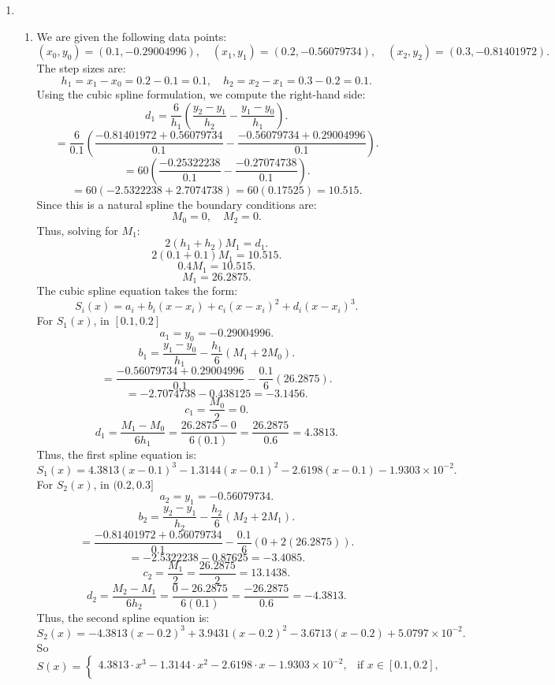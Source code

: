 \documentclass[12pt]{article}
\begin{document}
\begin{enumerate}[leftmargin=2em]
    \item
    \begin{enumerate}
        \item
        We are given the following data points:
        \[ (x_0, y_0) = (0.1, -0.29004996), \quad (x_1, y_1) = (0.2, -0.56079734), \quad (x_2, y_2) = (0.3, -0.81401972).   \]
        The step sizes are:
        \[h_1 = x_1 - x_0 = 0.2 - 0.1 = 0.1, \quad h_2 = x_2 - x_1 = 0.3 - 0.2 = 0.1.\]
        Using the cubic spline formulation, we compute the right-hand side: \[d_1 = \frac{6}{h_1} \left( \frac{y_2 - y_1}{h_2} - \frac{y_1 - y_0}{h_1} \right).\]
        \[= \frac{6}{0.1} \left( \frac{-0.81401972 + 0.56079734}{0.1} - \frac{-0.56079734 + 0.29004996}{0.1} \right).\]
        \[= 60 \left( \frac{-0.25322238}{0.1} - \frac{-0.27074738}{0.1} \right).\]
        \[= 60 (-2.5322238 + 2.7074738) = 60 (0.17525) = 10.515.\]
        Since this is a natural spline the boundary conditions are:
        \[M_0 = 0, \quad M_2 = 0.\]
        Thus, solving for \( M_1 \):
        \[2(h_1 + h_2) M_1 = d_1.\]
        \[2(0.1 + 0.1) M_1 = 10.515.\]
        \[0.4 M_1 = 10.515.\]
        \[M_1 = 26.2875.\]
        The cubic spline equation takes the form:
        \[S_i(x) = a_i + b_i (x - x_i) + c_i (x - x_i)^2 + d_i (x - x_i)^3.\]
        For \( S_1(x) \), in \( [0.1, 0.2] \)
        \[a_1 = y_0 = -0.29004996.\]
        \[b_1 = \frac{y_{1} - y_0}{h_1} - \frac{h_1}{6} (M_1 + 2M_0).\]
        \[= \frac{-0.56079734 + 0.29004996}{0.1} - \frac{0.1}{6} (26.2875).\]
        \[= -2.7074738 - 0.438125 = -3.1456.\]
        \[c_1 = \frac{M_0}{2} = 0.\]
        \[d_1 = \frac{M_1 - M_0}{6h_1} = \frac{26.2875 - 0}{6(0.1)} = \frac{26.2875}{0.6} = 4.3813.\]
        Thus, the first spline equation is:
        \[S_1(x) = 4.3813 (x - 0.1)^3 - 1.3144 (x - 0.1)^2 - 2.6198 (x - 0.1) - 1.9303 \times 10^{-2}.\]
        For \( S_2(x) \), in \( (0.2, 0.3] \)
        \[a_2 = y_1 = -0.56079734.\]
        \[b_2 = \frac{y_2 - y_1}{h_2} - \frac{h_2}{6} (M_2 + 2M_1).\]
        \[= \frac{-0.81401972 + 0.56079734}{0.1} - \frac{0.1}{6} (0 + 2(26.2875)).\]
        \[= -2.5322238 - 0.87625 = -3.4085.\]
        \[c_2 = \frac{M_1}{2} = \frac{26.2875}{2} = 13.1438.\]
        \[d_2 = \frac{M_2 - M_1}{6h_2} = \frac{0 - 26.2875}{6(0.1)} = \frac{-26.2875}{0.6} = -4.3813.\]
        Thus, the second spline equation is:
        \[S_2(x) = -4.3813 (x - 0.2)^3 + 3.9431 (x - 0.2)^2 - 3.6713 (x - 0.2) + 5.0797 \times 10^{-2}.\]
        So \[
            S(x) =
            \begin{cases} 
            4.3813 \cdot x^3 - 1.3144 \cdot x^2 - 2.6198 \cdot x - 1.9303 \times 10^{-2}, & \text{if } x \in [0.1,0.2], \\

\end{cases}\]
\end{enumerate}
\end{enumerate}
\end{document}
